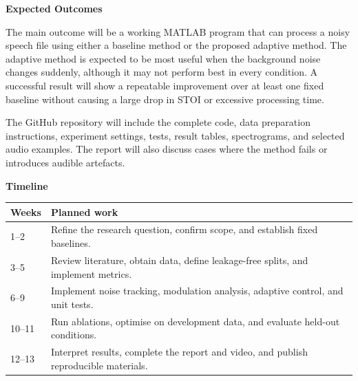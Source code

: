 \documentclass[11pt,a4paper]{article}
\newcommand{\projectsection}[1]{%
  \vspace{0.3em}%
  {\large\bfseries\color{accent} #1}\par
  \vspace{0.15em}%
}
\begin{document}
\projectsection{Expected Outcomes}

The main outcome will be a working MATLAB program that can process a noisy speech file using either a baseline method or the proposed adaptive method. The adaptive method is expected to be most useful when the background noise changes suddenly, although it may not perform best in every condition. A successful result will show a repeatable improvement over at least one fixed baseline without causing a large drop in STOI or excessive processing time.

The GitHub repository will include the complete code, data preparation instructions, experiment settings, tests, result tables, spectrograms, and selected audio examples. The report will also discuss cases where the method fails or introduces audible artefacts.

\projectsection{Timeline}

\begin{tabularx}{\textwidth}{|p{2.4cm}|X|}
\hline
\textbf{Weeks} & \textbf{Planned work} \\
\hline
1--2 & Refine the research question, confirm scope, and establish fixed baselines. \\
\hline
3--5 & Review literature, obtain data, define leakage-free splits, and implement metrics. \\
\hline
6--9 & Implement noise tracking, modulation analysis, adaptive control, and unit tests. \\
\hline
10--11 & Run ablations, optimise on development data, and evaluate held-out conditions. \\
\hline
12--13 & Interpret results, complete the report and video, and publish reproducible materials. \\
\hline
\end{tabularx}
\end{document}
